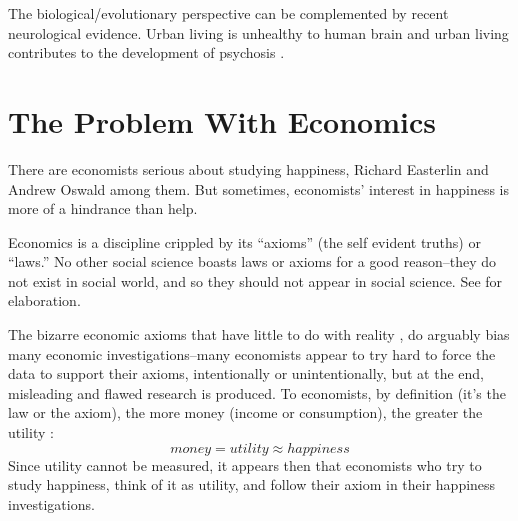 \documentclass[10pt, letterpaper]{article}
\begin{document}
 The biological/evolutionary perspective can be complemented by recent
 neurological evidence. Urban living is unhealthy to human brain \citep{lederbogen11} and urban
living contributes to the development of psychosis \citep{abrahamyan20}.
 
\section{The Problem With Economics} %

There are  %
 economists serious about studying happiness,
 Richard Easterlin and Andrew Oswald among them.
%
 But sometimes, economists' interest in happiness is more of a hindrance
 than help.
%
%
%

Economics is a discipline crippled by its ``axioms'' (the self evident truths)
or ``laws.'' No other social science boasts laws or axioms for a good
reason--they do not exist in social world, and so they should not appear in
social science. %
See \citet{feynman81} for elaboration.
 
The bizarre economic axioms that have little to do with reality
\citep{davies18}, do arguably %
bias many economic investigations--many economists appear to try hard to force
 the data to support their axioms, intentionally or unintentionally, but at the
 end, misleading and flawed research is produced. 
% 
To economists, by definition (it's the law or the axiom), the more money (income
or consumption), the greater the utility \citep[e.g.,][]{autor10}:
\begin{equation}
money = utility \approx happiness
\end{equation}%
Since utility cannot be measured, it appears then that economists who try to
study happiness, think of it as utility, and follow their axiom in their
happiness investigations. 
\end{document}
